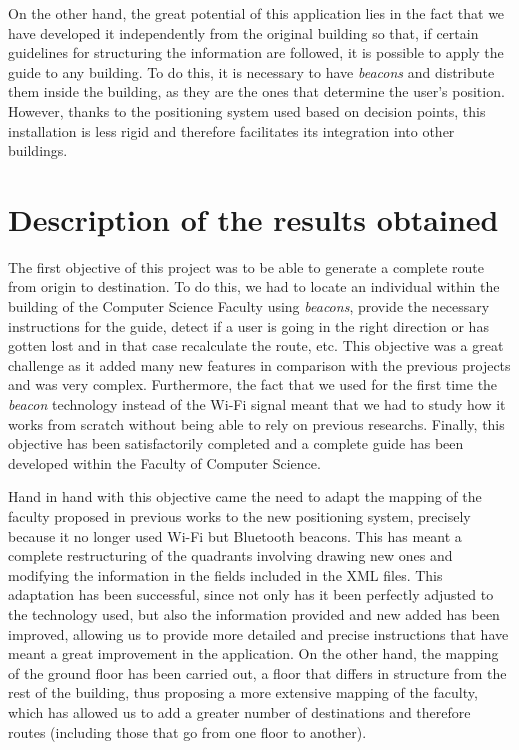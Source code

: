 On the other hand, the great potential of this application lies in the fact that we have developed it independently from the original building so that, if certain guidelines for structuring the information are followed, it is possible to apply the guide to any building. To do this, it is necessary to have \textit{beacons} and distribute them inside the building, as they are the ones that determine the user's position. However, thanks to the positioning system used based on decision points, this installation is less rigid and therefore facilitates its integration into other buildings. 


\section{Description of the results obtained}
\label{sec:descResult_eng}

The first objective of this project was to be able to generate a complete route from origin to destination. To do this, we had to locate an individual within the building of the Computer Science Faculty using \textit{beacons}, provide the necessary instructions for the guide, detect if a user is going in the right direction or has gotten lost and in that case recalculate the route, etc. This objective was a great challenge as it added many new features in comparison with the previous projects and was very complex. Furthermore, the fact that we used for the first time the \textit{beacon} technology instead of the Wi-Fi signal meant that we had to study how it works from scratch without being able to rely on previous researchs. Finally, this objective has been satisfactorily completed and a complete guide has been developed within the Faculty of Computer Science.

Hand in hand with this objective came the need to adapt the mapping of the faculty proposed in previous works to the new positioning system, precisely because it no longer used Wi-Fi but Bluetooth beacons. This has meant a complete restructuring of the quadrants involving drawing new ones and modifying the information in the fields included in the XML files. This adaptation has been successful, since not only has it been perfectly adjusted to the technology used, but also the information provided and new added has been improved, allowing us to provide more detailed and precise instructions that have meant a great improvement in the application. On the other hand, the mapping of the ground floor has been carried out, a floor that differs in structure from the rest of the building, thus proposing a more extensive mapping of the faculty, which has allowed us to add a greater number of destinations and therefore routes (including those that go from one floor to another).

